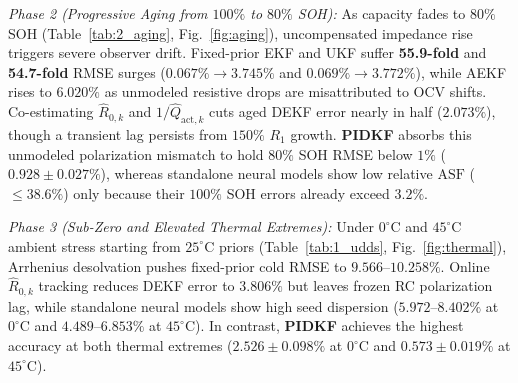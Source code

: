 \documentclass[10pt,a4paper]{article}
\begin{document}
\emph{Phase 2 (Progressive Aging from $100\%$ to $80\%$ SOH):} As capacity fades to $80\%$ SOH (Table~\ref{tab:2_aging}, Fig.~\ref{fig:aging}), uncompensated impedance rise triggers severe observer drift. Fixed-prior EKF and UKF suffer \textbf{55.9-fold} and \textbf{54.7-fold} RMSE surges ($0.067\% \rightarrow 3.745\%$ and $0.069\% \rightarrow 3.772\%$), while AEKF rises to $6.020\%$ as unmodeled resistive drops are misattributed to OCV shifts. Co-estimating $\hat{R}_{0,k}$ and $1/\hat{Q}_{\text{act},k}$ cuts aged DEKF error nearly in half ($2.073\%$), though a transient lag persists from $150\%$ $R_1$ growth. \textbf{PIDKF} absorbs this unmodeled polarization mismatch to hold $80\%$ SOH RMSE below $1\%$ ($0.928\pm0.027\%$), whereas standalone neural models show low relative $\text{ASF}$ ($\le 38.6\%$) only because their $100\%$ SOH errors already exceed $3.2\%$.

\emph{Phase 3 (Sub-Zero and Elevated Thermal Extremes):} Under $0^\circ\text{C}$ and $45^\circ\text{C}$ ambient stress starting from $25^\circ\text{C}$ priors (Table~\ref{tab:1_udds}, Fig.~\ref{fig:thermal}), Arrhenius desolvation pushes fixed-prior cold RMSE to $9.566\text{--}10.258\%$. Online $\hat{R}_{0,k}$ tracking reduces DEKF error to $3.806\%$ but leaves frozen RC polarization lag, while standalone neural models show high seed dispersion ($5.972\text{--}8.402\%$ at $0^\circ\text{C}$ and $4.489\text{--}6.853\%$ at $45^\circ\text{C}$). In contrast, \textbf{PIDKF} achieves the highest accuracy at both thermal extremes ($2.526\pm0.098\%$ at $0^\circ\text{C}$ and $0.573\pm0.019\%$ at $45^\circ\text{C}$).
\end{document}
